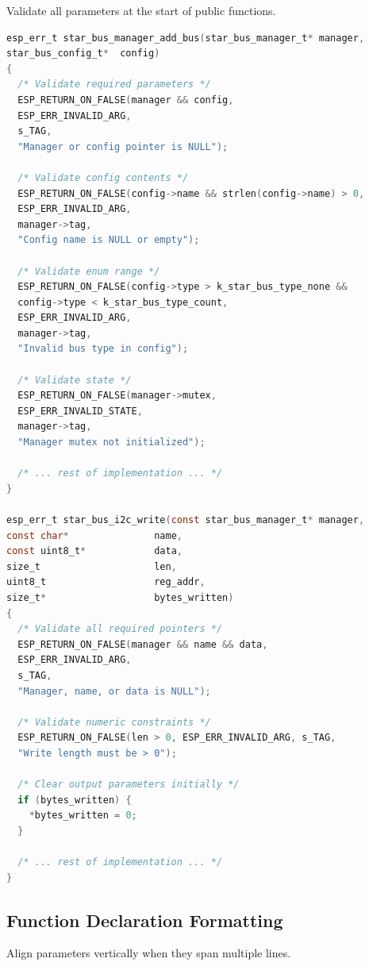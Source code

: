 Validate all parameters at the start of public functions.

\begin{lstlisting}[language=C]
esp_err_t star_bus_manager_add_bus(star_bus_manager_t* manager,
star_bus_config_t*  config)
{
  /* Validate required parameters */
  ESP_RETURN_ON_FALSE(manager && config,
  ESP_ERR_INVALID_ARG,
  s_TAG,
  "Manager or config pointer is NULL");
  
  /* Validate config contents */
  ESP_RETURN_ON_FALSE(config->name && strlen(config->name) > 0,
  ESP_ERR_INVALID_ARG,
  manager->tag,
  "Config name is NULL or empty");
  
  /* Validate enum range */
  ESP_RETURN_ON_FALSE(config->type > k_star_bus_type_none &&
  config->type < k_star_bus_type_count,
  ESP_ERR_INVALID_ARG,
  manager->tag,
  "Invalid bus type in config");
  
  /* Validate state */
  ESP_RETURN_ON_FALSE(manager->mutex,
  ESP_ERR_INVALID_STATE,
  manager->tag,
  "Manager mutex not initialized");
  
  /* ... rest of implementation ... */
}

esp_err_t star_bus_i2c_write(const star_bus_manager_t* manager,
const char*               name,
const uint8_t*            data,
size_t                    len,
uint8_t                   reg_addr,
size_t*                   bytes_written)
{
  /* Validate all required pointers */
  ESP_RETURN_ON_FALSE(manager && name && data,
  ESP_ERR_INVALID_ARG,
  s_TAG,
  "Manager, name, or data is NULL");
  
  /* Validate numeric constraints */
  ESP_RETURN_ON_FALSE(len > 0, ESP_ERR_INVALID_ARG, s_TAG,
  "Write length must be > 0");
  
  /* Clear output parameters initially */
  if (bytes_written) {
    *bytes_written = 0;
  }
  
  /* ... rest of implementation ... */
}
\end{lstlisting}

\subsection{Function Declaration Formatting}

Align parameters vertically when they span multiple lines.


